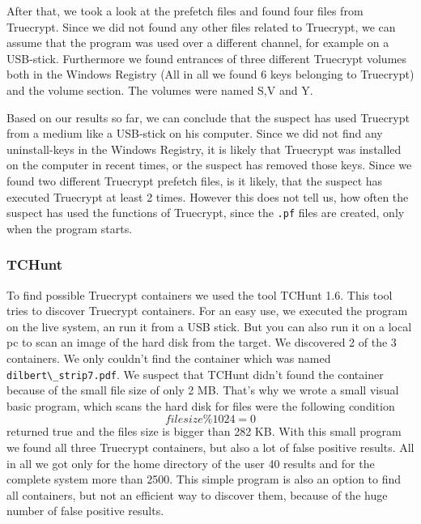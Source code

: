 After that, we took a look at the prefetch files and found four files from Truecrypt. Since we did not found any other files related to Truecrypt, we can assume that the program was used over a different channel, for example on a USB-stick. Furthermore we found entrances of three different Truecrypt volumes both in the  Windows Registry (All in all we found 6 keys belonging to Truecrypt) and the volume section. The volumes were named S,V and Y.

Based on our results so far, we can conclude that the suspect has used Truecrypt from a medium like a USB-stick on his computer. Since we did not find any uninstall-keys in the  Windows Registry, it is likely that Truecrypt was installed on the computer in recent times, or the suspect has removed those keys. Since we found two different Truecrypt prefetch files, is it likely, that the suspect has executed Truecrypt at least 2 times. However this does not tell us, how often the suspect has used the functions of Truecrypt, since the \verb+.pf+ files are created, only when the program starts.

\subsubsection{TCHunt}
To find possible Truecrypt containers we used the tool TCHunt 1.6. This tool tries to discover Truecrypt containers. For an easy use, we executed the program on the live system, an run it from a USB stick. But you can also run it on a local pc to scan an image of the hard disk from the target. We discovered 2 of the 3 containers. We only couldn't find the container which was named \verb+dilbert\_strip7.pdf+. We suspect that TCHunt didn't found the container because of the small file size of only 2 MB. That's why we wrote a small visual basic program, which scans the hard disk for files were the following condition  \[filesize \% 1024 = 0\] returned true and the files size is bigger than 282 KB. With this small program we found all three Truecrypt containers, but also a lot of false positive results. All in all we got only for the home directory of the user 40 results and for the complete system more than 2500. This simple program is also an option to find all containers, but not an efficient way to discover them, because of the huge number of false positive results.  

